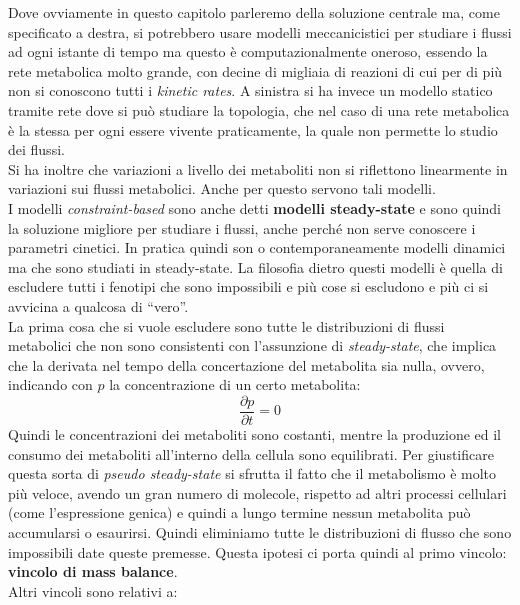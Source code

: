 \documentclass[a4paper,12pt, oneside]{book}
\begin{document}
Dove ovviamente in questo capitolo parleremo della soluzione centrale ma, come
specificato a destra, si potrebbero usare modelli meccanicistici per studiare i
flussi ad ogni istante di tempo ma questo è computazionalmente oneroso, essendo
la rete metabolica molto grande, con decine di migliaia di reazioni di cui per
di più non si conoscono tutti i \textit{kinetic rates}. A sinistra si ha invece
un modello statico tramite rete dove si può studiare la topologia, che nel caso
di una rete metabolica è la stessa per ogni essere vivente praticamente, la
quale non permette lo studio dei flussi.\\
Si ha inoltre che variazioni a livello dei metaboliti non si riflettono
linearmente in variazioni sui flussi metabolici. Anche per questo servono tali
modelli.\\
I modelli \textit{constraint-based} sono anche detti \textbf{modelli
  steady-state} e sono quindi la soluzione migliore per studiare i flussi, anche
perché non serve conoscere i parametri cinetici. In pratica quindi son o
contemporaneamente modelli dinamici ma che sono studiati in steady-state.
La filosofia dietro questi modelli è quella di escludere tutti i fenotipi che
sono impossibili e più cose si escludono e più ci si avvicina a qualcosa di
``vero''.\\
La prima cosa che si vuole escludere sono tutte le distribuzioni di flussi
metabolici che non sono consistenti con l'assunzione di \textit{steady-state},
che implica che la derivata nel tempo della concertazione del metabolita sia
nulla, 
ovvero, indicando con $p$ la concentrazione di un certo metabolita:
\[\frac{\partial p}{\partial t}=0\]
Quindi le concentrazioni dei metaboliti sono costanti, mentre la produzione ed
il consumo dei metaboliti all'interno della cellula sono equilibrati. 
Per giustificare questa sorta di \textit{pseudo steady-state} si sfrutta il
fatto che il metabolismo è molto più veloce, avendo un gran numero di molecole,
rispetto ad altri processi cellulari 
(come l'espressione genica) e quindi a lungo termine nessun metabolita può
accumularsi o esaurirsi. Quindi eliminiamo tutte le distribuzioni di flusso che
sono impossibili date queste premesse.
Questa ipotesi ci porta quindi al primo vincolo: \textbf{vincolo di mass
  balance}.\\ 
Altri vincoli sono relativi a:
\end{document}
